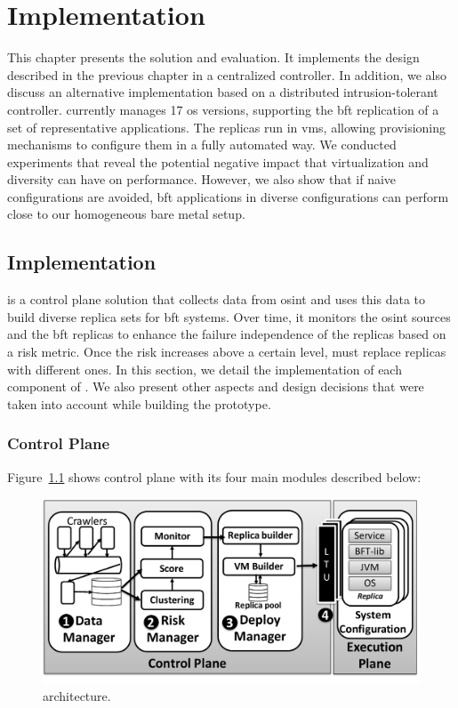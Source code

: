 \chapter{\system Implementation}
\label{chap:lazarus_implementation}

This chapter presents the \system solution and evaluation.
It implements the design described in the previous chapter in a centralized controller.
In addition, we also discuss an alternative implementation based on a distributed intrusion-tolerant controller.
\system currently manages 17 \gls{os} versions, supporting the \gls{bft} replication of a set of representative applications.
The replicas run in \glspl{vm}, allowing provisioning mechanisms to configure them in a fully automated way.
We conducted experiments that reveal the potential negative impact that virtualization and diversity can have on performance. 
However, we also show that if naive configurations are avoided, \gls{bft} applications in diverse configurations can perform close to our homogeneous bare metal setup.


\section{Implementation}
\label{sec:implementation}
\system is a control plane solution that collects data from \gls{osint} and uses this data to build diverse replica sets for \gls{bft} systems.
Over time, it monitors the \gls{osint} sources and the \gls{bft} replicas to enhance the failure independence of the replicas based on a risk metric.
Once the risk increases above a certain level, \system must replace replicas with different ones.
In this section, we detail the implementation of each component of \system. 
We also present other aspects and design decisions that were taken into account while building the prototype.%


\subsection{Control Plane}
\label{sec:lazarus}

Figure~\ref{fig:arch1} shows \system control plane with its four main modules described below:

\begin{figure}[t]
\begin{center}
\includegraphics[width=.8\columnwidth]{images/images/architecture_new.pdf}
\caption{\system architecture.}
\label{fig:arch1}
\end{center}
\end{figure}



